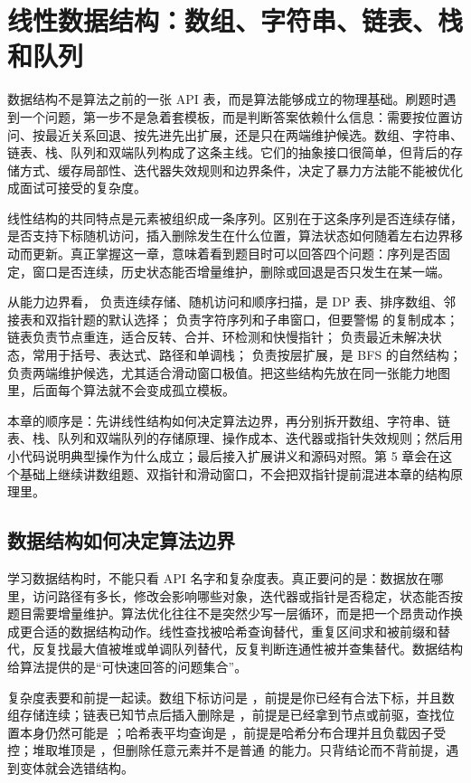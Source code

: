 \chapter{线性数据结构：数组、字符串、链表、栈和队列}

数据结构不是算法之前的一张 API 表，而是算法能够成立的物理基础。刷题时遇到一个问题，第一步不是急着套模板，而是判断答案依赖什么信息：需要按位置访问、按最近关系回退、按先进先出扩展，还是只在两端维护候选。数组、字符串、链表、栈、队列和双端队列构成了这条主线。它们的抽象接口很简单，但背后的存储方式、缓存局部性、迭代器失效规则和边界条件，决定了暴力方法能不能被优化成面试可接受的复杂度。

线性结构的共同特点是元素被组织成一条序列。区别在于这条序列是否连续存储，是否支持下标随机访问，插入删除发生在什么位置，算法状态如何随着左右边界移动而更新。真正掌握这一章，意味着看到题目时可以回答四个问题：序列是否固定，窗口是否连续，历史状态能否增量维护，删除或回退是否只发生在某一端。

从能力边界看， 负责连续存储、随机访问和顺序扫描，是 DP 表、排序数组、邻接表和双指针题的默认选择； 负责字符序列和子串窗口，但要警惕  的复制成本；链表负责节点重连，适合反转、合并、环检测和快慢指针； 负责最近未解决状态，常用于括号、表达式、路径和单调栈； 负责按层扩展，是 BFS 的自然结构； 负责两端维护候选，尤其适合滑动窗口极值。把这些结构先放在同一张能力地图里，后面每个算法就不会变成孤立模板。

本章的顺序是：先讲线性结构如何决定算法边界，再分别拆开数组、字符串、链表、栈、队列和双端队列的存储原理、操作成本、迭代器或指针失效规则；然后用小代码说明典型操作为什么成立；最后接入扩展讲义和源码对照。第 5 章会在这个基础上继续讲数组题、双指针和滑动窗口，不会把双指针提前混进本章的结构原理里。

\section{数据结构如何决定算法边界}

学习数据结构时，不能只看 API 名字和复杂度表。真正要问的是：数据放在哪里，访问路径有多长，修改会影响哪些对象，迭代器或指针是否稳定，状态能否按题目需要增量维护。算法优化往往不是突然少写一层循环，而是把一个昂贵动作换成更合适的数据结构动作。线性查找被哈希查询替代，重复区间求和被前缀和替代，反复找最大值被堆或单调队列替代，反复判断连通性被并查集替代。数据结构给算法提供的是“可快速回答的问题集合”。

复杂度表要和前提一起读。数组下标访问是 ，前提是你已经有合法下标，并且数组存储连续；链表已知节点后插入删除是 ，前提是已经拿到节点或前驱，查找位置本身仍然可能是 ；哈希表平均查询是 ，前提是哈希分布合理并且负载因子受控；堆取堆顶是 ，但删除任意元素并不是普通  的能力。只背结论而不背前提，遇到变体就会选错结构。

